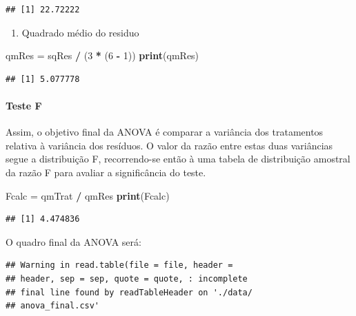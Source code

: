 \documentclass[
]{article}
\newenvironment{Shaded}{\begin{snugshade}}{\end{snugshade}}
\newcommand{\DecValTok}[1]{\textcolor[rgb]{0.00,0.00,0.81}{#1}}
\newcommand{\KeywordTok}[1]{\textcolor[rgb]{0.13,0.29,0.53}{\textbf{#1}}}
\newcommand{\NormalTok}[1]{#1}
\newcommand{\OperatorTok}[1]{\textcolor[rgb]{0.81,0.36,0.00}{\textbf{#1}}}
\newcommand{\StringTok}[1]{\textcolor[rgb]{0.31,0.60,0.02}{#1}}
\providecommand{\tightlist}{%
  \setlength{\itemsep}{0pt}\setlength{\parskip}{0pt}}
\begin{document}
\begin{verbatim}
## [1] 22.72222
\end{verbatim}

\begin{enumerate}
\def\labelenumi{\arabic{enumi}.}
\setcounter{enumi}{1}
\tightlist
\item
  Quadrado médio do residuo
\end{enumerate}

\begin{Shaded}
\begin{Highlighting}[]
\NormalTok{qmRes =}\StringTok{ }\NormalTok{sqRes }\OperatorTok{/}\StringTok{ }\NormalTok{(}\DecValTok{3} \OperatorTok{*}\StringTok{ }\NormalTok{(}\DecValTok{6} \OperatorTok{-}\StringTok{ }\DecValTok{1}\NormalTok{))}
\KeywordTok{print}\NormalTok{(qmRes)}
\end{Highlighting}
\end{Shaded}

\begin{verbatim}
## [1] 5.077778
\end{verbatim}

\hypertarget{teste-f}{%
\paragraph{Teste F}\label{teste-f}}

Assim, o objetivo final da ANOVA é comparar a variância dos tratamentos relativa à variância dos resíduos. O valor da razão entre estas duas variâncias segue a distribuição F, recorrendo-se então à uma tabela de distribuição amostral da razão F para avaliar a significância do teste.

\begin{Shaded}
\begin{Highlighting}[]
\NormalTok{Fcalc =}\StringTok{ }\NormalTok{qmTrat }\OperatorTok{/}\StringTok{ }\NormalTok{qmRes}
\KeywordTok{print}\NormalTok{(Fcalc)}
\end{Highlighting}
\end{Shaded}

\begin{verbatim}
## [1] 4.474836
\end{verbatim}

O quadro final da ANOVA será:

\begin{verbatim}
## Warning in read.table(file = file, header =
## header, sep = sep, quote = quote, : incomplete
## final line found by readTableHeader on './data/
## anova_final.csv'
\end{verbatim}
\end{document}
